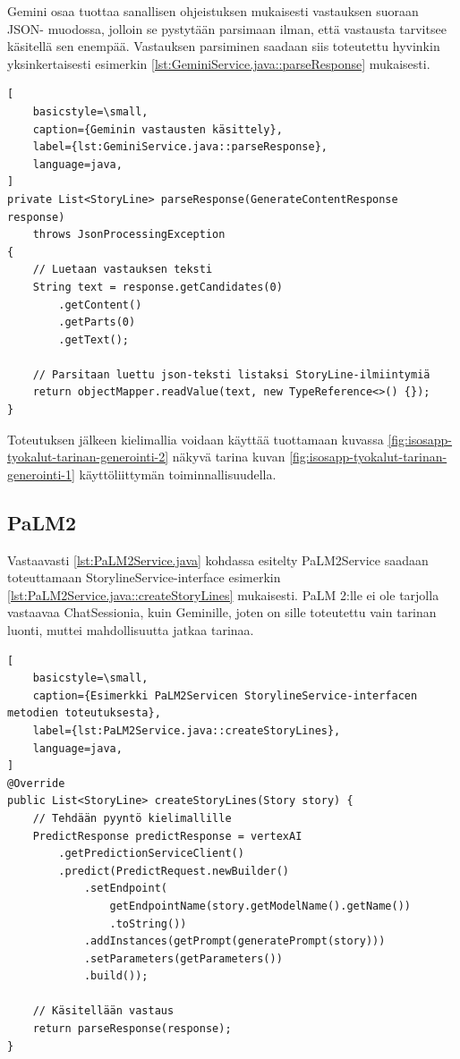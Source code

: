 Gemini osaa tuottaa sanallisen ohjeistuksen mukaisesti vastauksen suoraan JSON-
muodossa, jolloin se pystytään parsimaan ilman, että vastausta tarvitsee
käsitellä sen enempää. Vastauksen parsiminen saadaan siis toteutettu hyvinkin
yksinkertaisesti esimerkin \ref{lst:GeminiService.java::parseResponse}
mukaisesti.

\begin{lstlisting}[
    basicstyle=\small,
    caption={Geminin vastausten käsittely},
    label={lst:GeminiService.java::parseResponse},
    language=java,
]
private List<StoryLine> parseResponse(GenerateContentResponse response)
    throws JsonProcessingException
{
    // Luetaan vastauksen teksti
    String text = response.getCandidates(0)
        .getContent()
        .getParts(0)
        .getText();

    // Parsitaan luettu json-teksti listaksi StoryLine-ilmiintymiä
    return objectMapper.readValue(text, new TypeReference<>() {});
}
\end{lstlisting}

Toteutuksen jälkeen kielimallia voidaan käyttää tuottamaan kuvassa
\ref{fig:isosapp-tyokalut-tarinan-generointi-2} näkyvä tarina kuvan
\ref{fig:isosapp-tyokalut-tarinan-generointi-1} käyttöliittymän
toiminnallisuudella.

\subsection{PaLM2}

Vastaavasti \ref{lst:PaLM2Service.java} kohdassa esitelty PaLM2Service saadaan
toteuttamaan StorylineService-interface esimerkin
\ref{lst:PaLM2Service.java::createStoryLines} mukaisesti. PaLM 2:lle ei ole
tarjolla vastaavaa ChatSessionia, kuin Geminille, joten on sille toteutettu
vain tarinan luonti, muttei mahdollisuutta jatkaa tarinaa.

\begin{lstlisting}[
    basicstyle=\small,
    caption={Esimerkki PaLM2Servicen StorylineService-interfacen metodien toteutuksesta},
    label={lst:PaLM2Service.java::createStoryLines},
    language=java,
]
@Override
public List<StoryLine> createStoryLines(Story story) {
    // Tehdään pyyntö kielimallille
    PredictResponse predictResponse = vertexAI
        .getPredictionServiceClient()
        .predict(PredictRequest.newBuilder()
            .setEndpoint(
                getEndpointName(story.getModelName().getName())
                .toString())
            .addInstances(getPrompt(generatePrompt(story)))
            .setParameters(getParameters())
            .build());

    // Käsitellään vastaus
    return parseResponse(response);
}
\end{lstlisting}

